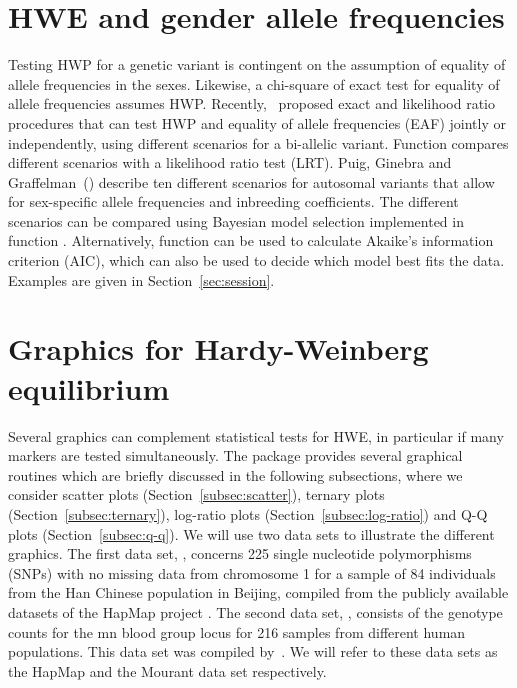 \documentclass[nojss]{jss}
\begin{document}
\section{HWE and gender allele frequencies}

Testing HWP for a genetic variant is contingent on the assumption of equality of allele frequencies in the sexes. Likewise, a chi-square of exact test for equality of allele frequencies assumes HWP. Recently,~\cite{Graffel31} proposed exact and likelihood ratio procedures that can test HWP and equality of allele frequencies (EAF) jointly or independently, using different scenarios for a bi-allelic variant. Function  compares different scenarios with a likelihood ratio test (LRT). Puig, Ginebra and Graffelman~(\citeyear{Puig2}) describe ten different scenarios for autosomal variants that allow for sex-specific allele frequencies and inbreeding coefficients. The different scenarios can be compared using Bayesian model selection implemented in function . Alternatively, function  can be used to calculate Akaike's information criterion (AIC), which can also be used to decide which model best fits the data. Examples are given in Section~\ref{sec:session}. 

\section{Graphics for Hardy-Weinberg equilibrium}
\label{sec:graphics}

Several graphics can complement statistical tests for HWE, in
particular if many markers are tested simultaneously.  The package
 provides several graphical routines which are
briefly discussed in the following subsections, where we consider
scatter plots (Section~\ref{subsec:scatter}), ternary plots
(Section~\ref{subsec:ternary}), log-ratio plots
(Section~\ref{subsec:log-ratio}) and Q-Q plots
(Section~\ref{subsec:q-q}). We will use two data sets to illustrate
the different graphics. The first data set, ,
concerns 225 single nucleotide polymorphisms (SNPs) with no missing
data from chromosome 1 for a sample of 84 individuals from the Han
Chinese population in Beijing, compiled from the publicly available
datasets of the HapMap project
\citep[\url{http://hapmap.ncbi.nlm.nih.gov/},][]{HapMap3}.  The
second data set, , consists of the genotype counts for
the {\sc mn} blood group locus for 216 samples from different human
populations. This data set was compiled by~\citet[Table
2.5]{Mourant}. We will refer to these data sets as the HapMap and the
Mourant data set respectively.
\end{document}
